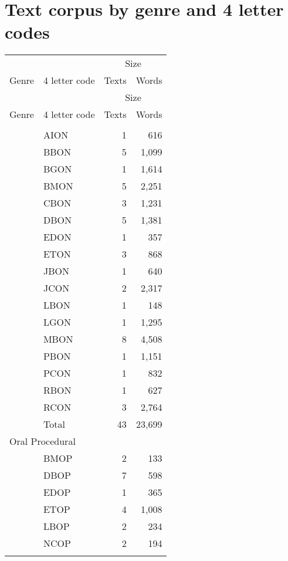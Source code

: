 \chapter{Text corpus by genre and 4 letter codes}\label{app:a}
    \begin{longtable}{llrr}
		\label{appendix-a}\\
		\lsptoprule
		 &  & \multicolumn{2}{c}{Size}\\\cmidrule(lr){3-4}
		Genre & 4 letter code & Texts & Words\\\midrule\endfirsthead
           	\midrule
    	 & & \multicolumn{2}{c}{Size}\\\cmidrule(lr){3-4}
    	Genre &  4 letter code & Texts & Words\\\midrule\endhead\endfoot\lspbottomrule\endlastfoot
		\multicolumn{4}{l}{Oral Narrative}\\
		& AION & 1 & 616\\
		& BBON & 5 & 1,099\\
		& BGON & 1 & 1,614\\
		& BMON & 5 & 2,251\\
		& CBON & 3 & 1,231\\
		& DBON & 5 & 1,381\\
		& EDON & 1 & 357\\
		& ETON & 3 & 868\\
		& JBON & 1 & 640\\
		& JCON & 2 & 2,317\\
		& LBON & 1 & 148\\
		& LGON & 1 & 1,295\\
		& MBON & 8 & 4,508\\
		& PBON & 1 & 1,151\\
		& PCON & 1 & 832\\
		& RBON & 1 & 627\\
		& RCON & 3 & 2,764\\\addlinespace
		& Total &  43 & 23,699\\\midrule
		\multicolumn{4}{l}{Oral Procedural} \\
		& BMOP & 2 & 133\\
		& DBOP & 7 & 598\\
		& EDOP & 1 & 365\\
		& ETOP & 4 & 1,008\\
		& LBOP & 2 & 234\\
		& NCOP & 2 & 194\\\addlinespace

\end{longtable}
